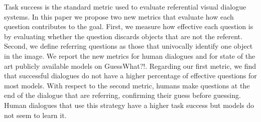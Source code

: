 Task success is the standard metric used to evaluate referential visual dialogue systems. In this paper we propose two new metrics that evaluate how each question contributes to the goal. First, we measure how effective each question is by evaluating whether the question discards objects that are not the referent. Second, we define referring questions as those that univocally identify one object in the image. We report the new metrics for human dialogues and for state of the art publicly available models on GuessWhat?!. Regarding our first metric, we find that successful dialogues do not have a higher percentage of effective questions for most models. With respect to the second metric, humans make questions at the end of the dialogue that are referring, confirming their guess before guessing. Human dialogues that use this strategy have a higher task success but models do not seem to learn it.
